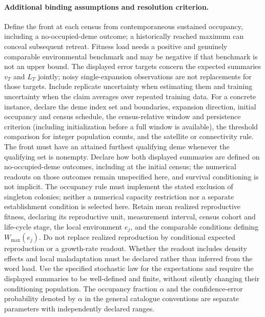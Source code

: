 \documentclass[11pt]{article}
\begin{document}
\paragraph{Additional binding assumptions and resolution criterion.} Define the front at each census from contemporaneous sustained occupancy, including a no-occupied-deme outcome; a historically reached maximum can conceal subsequent retreat. Fitness load needs a positive and genuinely comparable environmental benchmark and may be negative if that benchmark is not an upper bound. The displayed error targets concern the expected summaries $v_T$ and $L_T$ jointly; noisy single-expansion observations are not replacements for those targets. Include replicate uncertainty when estimating them and training uncertainty when the claim averages over repeated training data. For a concrete instance, declare the deme index set and boundaries, expansion direction, initial occupancy and census schedule, the census-relative window and persistence criterion (including initialization before a full window is available), the threshold comparison for integer population counts, and the satellite or connectivity rule. The front must have an attained furthest qualifying deme whenever the qualifying set is nonempty. Declare how both displayed summaries are defined on no-occupied-deme outcomes, including at the initial census; the numerical readouts on those outcomes remain unspecified here, and survival conditioning is not implicit. The occupancy rule must implement the stated exclusion of singleton colonies; neither a numerical capacity restriction nor a separate establishment condition is selected here. Retain mean realized reproductive fitness, declaring its reproductive unit, measurement interval, census cohort and life-cycle stage, the local environment $e_j$, and the comparable conditions defining $W_{\max}(e_j)$. Do not replace realized reproduction by conditional expected reproduction or a growth-rate readout. Whether the readout includes density effects and local maladaptation must be declared rather than inferred from the word load. Use the specified stochastic law for the expectations and require the displayed summaries to be well-defined and finite, without silently changing their conditioning population. The occupancy fraction $\alpha$ and the confidence-error probability denoted by $\alpha$ in the general catalogue conventions are separate parameters with independently declared ranges.
\end{document}

